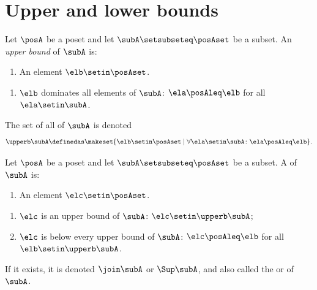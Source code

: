 
\section{Upper and lower bounds}


\begin{ctdefinition}
    \label{def:least-upper-bound}
    \label{def:upper-bounds}
    Let $\posA$ be a poset and let $\subA \setsubseteq \posAset$ be a subset.
    An \emph{upper bound} of $\subA$ is:

    \constit
    \begin{enumerate}
        \item An element $\elb \setin \posAset$.
    \end{enumerate}

    \condit
    \begin{enumerate}
        \item $\elb$ dominates all elements of $\subA$: $\ela \posAleq \elb$ for all $\ela \setin \subA$.
    \end{enumerate}
    The set of all  of $\subA$ is denoted
    \begin{equation}
        \upperb \subA\definedas \makeset{ \elb \setin \posAset \mid \forall \ela \setin \subA \colon \ela \posAleq \elb }.
    \end{equation}
\end{ctdefinition}

\begin{ctdefinition}\label{def:supremum}
    Let $\posA$ be a poset and let $\subA \setsubseteq \posAset$ be a subset.
    A  of $\subA$ is:

    \constit
    \begin{enumerate}
        \item An element $\elc \setin \posAset$.
    \end{enumerate}

    \condit
    \begin{enumerate}
        \item $\elc$ is an upper bound of $\subA$: $\elc \setin \upperb \subA$;
        \item $\elc$ is below every upper bound of $\subA$: $\elc \posAleq \elb$ for all $\elb \setin \upperb \subA$.
    \end{enumerate}
    If it exists, it is denoted $\join \subA$ or $\Sup\subA$, and also called the  or  of $\subA$.
\end{ctdefinition}

